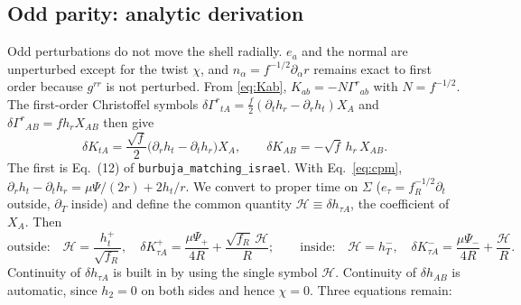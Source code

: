 \documentclass[11pt,a4paper]{article}
\numberwithin{equation}{section}
\newcommand{\sq}{\sqrt{f_R}}
\begin{document}
\subsection{Odd parity: analytic derivation}\label{sec:odd}
Odd perturbations do not move the shell radially. $e_a$ and the normal are unperturbed except for the twist
$\chi$, and $n_\alpha=f^{-1/2}\partial_\alpha r$ remains exact to first order because $g^{rr}$ is not perturbed.
From \eqref{eq:Kab}, $K_{ab}=-N\Gamma^r{}_{ab}$ with $N=f^{-1/2}$. The first-order Christoffel symbols
$\delta\Gamma^r{}_{tA}=\tfrac f2(\partial_th_r-\partial_rh_t)X_A$ and $\delta\Gamma^r{}_{AB}=f h_r X_{AB}$ then give
\begin{equation}
\delta K_{tA}=\frac{\sqrt f}{2}\big(\partial_rh_t-\partial_th_r\big)X_A,\qquad
\delta K_{AB}=-\sqrt f\,h_r\,X_{AB}.
\label{eq:dKodd}
\end{equation}
The first is Eq.~(12) of \texttt{burbuja\_matching\_israel}. With Eq.~\eqref{eq:cpm},
$\partial_rh_t-\partial_th_r=\mu\Psi/(2r)+2h_t/r$. We convert to proper time on $\Sigma$
($e_\tau=f_R^{-1/2}\partial_t$ outside, $\partial_T$ inside) and define the common quantity
$\mathcal H\equiv\delta h_{\tau A}$, the coefficient of $X_A$. Then
\begin{equation}
\text{outside:}\quad \mathcal H=\frac{h_t^+}{\sq},\quad \delta K^+_{\tau A}=\frac{\mu\Psi_+}{4R}+\frac{\sq\,\mathcal H}{R};\qquad
\text{inside:}\quad \mathcal H=h_T^-,\quad \delta K^-_{\tau A}=\frac{\mu\Psi_-}{4R}+\frac{\mathcal H}{R}.
\label{eq:oddside}
\end{equation}
Continuity of $\delta h_{\tau A}$ is built in by using the single symbol $\mathcal H$. Continuity of
$\delta h_{AB}$ is automatic, since $h_2=0$ on both sides and hence $\chi=0$. Three equations remain:
\end{document}
